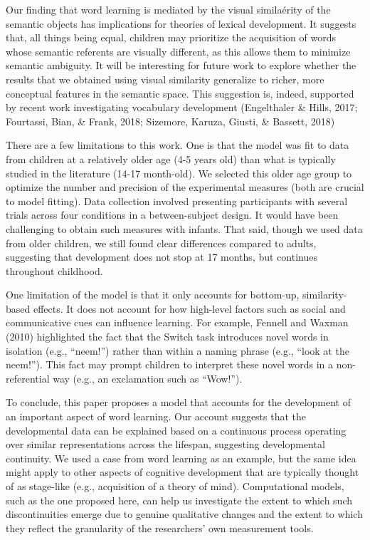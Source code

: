 \documentclass[english,,man,floatsintext]{apa6}
\theoremstyle{definition}
\theoremstyle{definition}
\theoremstyle{definition}
\theoremstyle{remark}
\begin{document}
Our finding that word learning is mediated by the visual similaérity of
the semantic objects has implications for theories of lexical
development. It suggests that, all things being equal, children may
prioritize the acquisition of words whose semantic referents are
visually different, as this allows them to minimize semantic ambiguity.
It will be interesting for future work to explore whether the results
that we obtained using visual similarity generalize to richer, more
conceptual features in the semantic space. This suggestion is, indeed,
supported by recent work investigating vocabulary development
(Engelthaler \& Hills, 2017; Fourtassi, Bian, \& Frank, 2018; Sizemore,
Karuza, Giusti, \& Bassett, 2018)

There are a few limitations to this work. One is that the model was fit
to data from children at a relatively older age (4-5 years old) than
what is typically studied in the literature (14-17 month-old). We
selected this older age group to optimize the number and precision of
the experimental measures (both are crucial to model fitting). Data
collection involved presenting participants with several trials across
four conditions in a between-subject design. It would have been
challenging to obtain such measures with infants. That said, though we
used data from older children, we still found clear differences compared
to adults, suggesting that development does not stop at 17 months, but
continues throughout childhood.

One limitation of the model is that it only accounts for bottom-up,
similarity-based effects. It does not account for how high-level factors
such as social and communicative cues can influence learning. For
example, Fennell and Waxman (2010) highlighted the fact that the Switch
task introduces novel words in isolation (e.g., \enquote{neem!}) rather
than within a naming phrase (e.g., \enquote{look at the neem!}). This
fact may prompt children to interpret these novel words in a
non-referential way (e.g., an exclamation such as \enquote{Wow!}).

To conclude, this paper proposes a model that accounts for the
development of an important aspect of word learning. Our account
suggests that the developmental data can be explained based on a
continuous process operating over similar representations across the
lifespan, suggesting developmental continuity. We used a case from word
learning as an example, but the same idea might apply to other aspects
of cognitive development that are typically thought of as stage-like
(e.g., acquisition of a theory of mind). Computational models, such as
the one proposed here, can help us investigate the extent to which such
discontinuities emerge due to genuine qualitative changes and the extent
to which they reflect the granularity of the researchers' own
measurement tools.
\end{document}
